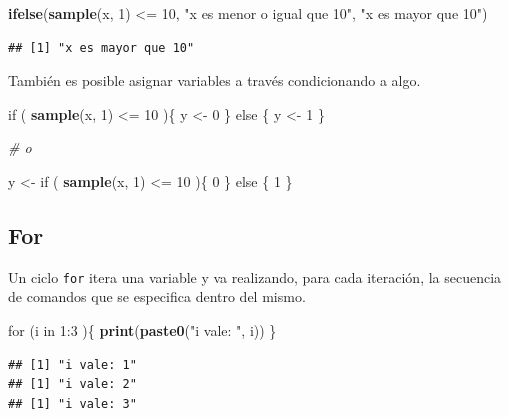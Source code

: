 \documentclass[]{article}
\newenvironment{Shaded}{\begin{snugshade}}{\end{snugshade}}
\newcommand{\KeywordTok}[1]{\textcolor[rgb]{0.13,0.29,0.53}{\textbf{{#1}}}}
\newcommand{\DecValTok}[1]{\textcolor[rgb]{0.00,0.00,0.81}{{#1}}}
\newcommand{\StringTok}[1]{\textcolor[rgb]{0.31,0.60,0.02}{{#1}}}
\newcommand{\CommentTok}[1]{\textcolor[rgb]{0.56,0.35,0.01}{\textit{{#1}}}}
\newcommand{\NormalTok}[1]{{#1}}
\begin{document}
\begin{Shaded}
\begin{Highlighting}[]
\KeywordTok{ifelse}\NormalTok{(}\KeywordTok{sample}\NormalTok{(x, }\DecValTok{1}\NormalTok{) <=}\StringTok{ }\DecValTok{10}\NormalTok{, }\StringTok{"x es menor o igual que 10"}\NormalTok{, }\StringTok{"x es mayor que 10"}\NormalTok{)}
\end{Highlighting}
\end{Shaded}

\begin{verbatim}
## [1] "x es mayor que 10"
\end{verbatim}

También es posible asignar variables a través condicionando a algo.

\begin{Shaded}
\begin{Highlighting}[]
\NormalTok{if ( }\KeywordTok{sample}\NormalTok{(x, }\DecValTok{1}\NormalTok{) <=}\StringTok{ }\DecValTok{10} \NormalTok{)\{}
  \NormalTok{y <-}\StringTok{ }\DecValTok{0}
\NormalTok{\} else \{}
  \NormalTok{y <-}\StringTok{ }\DecValTok{1}
\NormalTok{\}}

\CommentTok{# o}

\NormalTok{y <-}\StringTok{ }\NormalTok{if ( }\KeywordTok{sample}\NormalTok{(x, }\DecValTok{1}\NormalTok{) <=}\StringTok{ }\DecValTok{10} \NormalTok{)\{}
    \DecValTok{0}
  \NormalTok{\} else \{}
    \DecValTok{1}
  \NormalTok{\}}
\end{Highlighting}
\end{Shaded}

\subsection{For}\label{for}

Un ciclo \texttt{for} itera una variable y va realizando, para cada
iteración, la secuencia de comandos que se especifica dentro del mismo.

\begin{Shaded}
\begin{Highlighting}[]
\NormalTok{for (i in }\DecValTok{1}\NormalTok{:}\DecValTok{3} \NormalTok{)\{}
  \KeywordTok{print}\NormalTok{(}\KeywordTok{paste0}\NormalTok{(}\StringTok{"i vale: "}\NormalTok{, i))}
\NormalTok{\}}
\end{Highlighting}
\end{Shaded}

\begin{verbatim}
## [1] "i vale: 1"
## [1] "i vale: 2"
## [1] "i vale: 3"
\end{verbatim}
\end{document}
